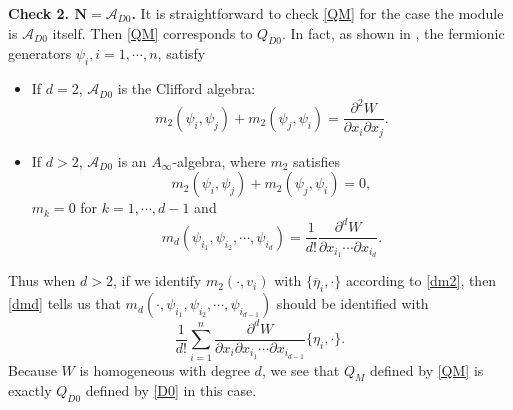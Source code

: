 \documentclass[a4paper,11pt]{article}
\def\cA{\mathcal{A}}
\newcommand{\Af}{{A_\infty}}
\numberwithin{equation}{section}
\begin{document}
{\bf Check 2. $\mathbf{N}=\mathcal{A}_{D0}$.} It is straightforward to check 
\eqref{QM} for the case the module is $\mathcal{A}_{D0}$ itself. Then \eqref{QM}
corresponds to $Q_{D0}$. In fact, as shown in \cite{ballard2014derived}, the 
fermionic generators 
$\psi_i, i=1,\cdots,n$, satisfy
\begin{itemize}
\item If $d=2$, $\cA_{D0}$ is the Clifford algebra:
\begin{equation}\label{2m2}
m_2(\psi_i,\psi_j)+m_2(\psi_j,\psi_i) = \frac{\partial^2 W}{\partial x_i 
\partial x_j}.
\end{equation}
\item If $d>2$, $\cA_{D0}$ is an $\Af$-algebra, where $m_2$ satisfies
\begin{equation}\label{dm2}
m_2(\psi_i,\psi_j)+m_2(\psi_j,\psi_i)=0,
\end{equation} 
$m_k=0$ for $k=1,\cdots,d-1$ and
\begin{equation}\label{dmd}
m_d(\psi_{i_1},\psi_{i_2},\cdots,\psi_{i_d}) = \frac{1}{d!}\frac{\partial^d 
W}{\partial 
x_{i_1} \cdots \partial x_{i_d}}.
\end{equation}
\end{itemize}
Thus when $d>2$, if we identify $m_2(\cdot, v_i)$ with 
$\{\overline{\eta}_i,\cdot\}$ according to \eqref{dm2}, then \eqref{dmd} tells 
us that $m_d(\cdot, \psi_{i_1},\psi_{i_2},\cdots,\psi_{i_{d-1}})$ should be 
identified 
with 
\[
\frac{1}{d!} \sum_{i=1}^n \frac{\partial^d W}{\partial x_i \partial x_{i_1} 
\cdots \partial x_{i_{d-1}}} \{ \eta_i, \cdot \}.
\]
Because $W$ is homogeneous with degree $d$, we see that $Q_M$ defined by 
\eqref{QM} is exactly $Q_{D0}$ defined by \eqref{D0} in this case.
\end{document}
